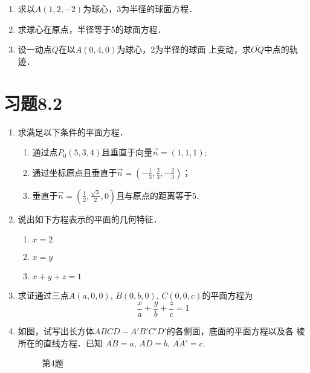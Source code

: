 \begin{ex}
\begin{enumerate}
    \item 求以$A(1,2,-2)$为球心，3为半径的球面方程．
    \item 求球心在原点，半径等于5的球面方程．
    \item 设一动点$Q$在以$A(0,4,0)$为球心，2为半径的球面
    上变动，求$\overline{OQ}$中点的轨迹．
\end{enumerate}
\end{ex}

\section*{习题8.2}

\begin{enumerate}
    \item 求满足以下条件的平面方程．
\begin{enumerate}
\item 通过点$P_0(5,3,4)$且垂直于向量$\vec{n}=(1,1,1)$;
\item 通过坐标原点且垂直于$\vec{n}=\left(-\frac{1}{3},\frac{2}{3},-\frac{2}{3}\right)$；
\item 垂直于$\vec{n}=\left(\frac{1}{2},\frac{\sqrt{3}}{2},0\right)$且与原点的距离等于5.
\end{enumerate}

    \item 说出如下方程表示的平面的几何特征．
\begin{multicols}{3}
\begin{enumerate}
    \item $x=2$ \item $x=y$ \item $x+y+z=1$
\end{enumerate}
\end{multicols}

    \item 求证通过三点$A(a,0,0)$, $B(0,b,0)$, $C(0,
    0,c)$的平面方程为
\[\frac{x}{a}+\frac{y}{b}+\frac{z}{c}=1\] 

\item 如图，试写出长方体$ABC
D-A'B'C'D'$的各侧面，底面的平面方程以及各
棱所在的直线方程．已知
$\overline{AB}=a$, $\overline{AD}=b$, 
$\overline{AA'}=c$.

\begin{figure}[htp]
    \centering
{}
    \caption*{第4题}
\end{figure}



\end{enumerate}
